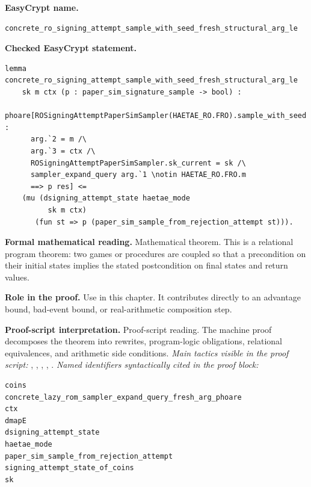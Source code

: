 \begin{formaltheorem}
\noindent\textbf{EasyCrypt name.}
\begin{lstlisting}[language=EasyCrypt,basicstyle=\ttfamily\scriptsize]
concrete_ro_signing_attempt_sample_with_seed_fresh_structural_arg_le
\end{lstlisting}
\noindent\textbf{Checked EasyCrypt statement.}
\begin{lstlisting}[language=EasyCrypt,basicstyle=\ttfamily\scriptsize]
lemma concrete_ro_signing_attempt_sample_with_seed_fresh_structural_arg_le
    sk m ctx (p : paper_sim_signature_sample -> bool) :
  phoare[ROSigningAttemptPaperSimSampler(HAETAE_RO.FRO).sample_with_seed :
      arg.`2 = m /\
      arg.`3 = ctx /\
      ROSigningAttemptPaperSimSampler.sk_current = sk /\
      sampler_expand_query arg.`1 \notin HAETAE_RO.FRO.m
      ==> p res] <=
    (mu (dsigning_attempt_state haetae_mode
          sk m ctx)
       (fun st => p (paper_sim_sample_from_rejection_attempt st))).
\end{lstlisting}
\noindent\textbf{Formal mathematical reading.}
Mathematical theorem. This is a relational program theorem: two games or procedures are coupled so that a precondition on their initial states implies the stated postcondition on final states and return values.

\noindent\textbf{Role in the proof.}
Use in this chapter. It contributes directly to an advantage bound, bad-event bound, or real-arithmetic composition step.

\noindent\textbf{Proof-script interpretation.}
Proof-script reading. The machine proof decomposes the theorem into rewrites, program-logic obligations, relational equivalences, and arithmetic side conditions.
\emph{Main tactics visible in the proof script:} , , , , .
\emph{Named identifiers syntactically cited in the proof block:}
\begin{lstlisting}[language=EasyCrypt,basicstyle=\ttfamily\scriptsize]
coins
concrete_lazy_rom_sampler_expand_query_fresh_arg_phoare
ctx
dmapE
dsigning_attempt_state
haetae_mode
paper_sim_sample_from_rejection_attempt
signing_attempt_state_of_coins
sk
\end{lstlisting}

\end{formaltheorem}


